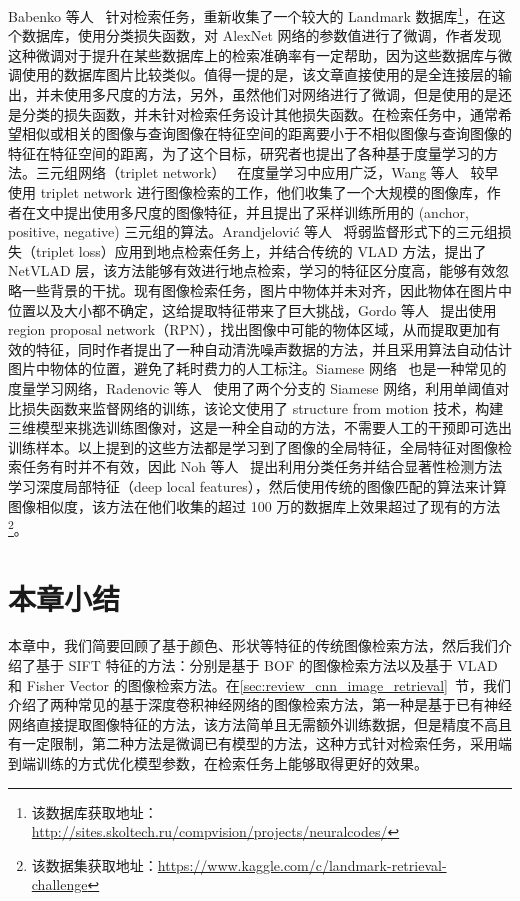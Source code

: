 Babenko 等人~\cite{Babenko2014NeuralCF} 针对检索任务，重新收集了一个较大的 Landmark 数据库\footnote{该数据库获取地址：\url{http://sites.skoltech.ru/compvision/projects/neuralcodes/}}，在这个数据库，使用分类损失函数，对 AlexNet 网络的参数值进行了微调，作者发现这种微调对于提升在某些数据库上的检索准确率有一定帮助，因为这些数据库与微调使用的数据库图片比较类似。值得一提的是，该文章直接使用的是全连接层的输出，并未使用多尺度的方法，另外，虽然他们对网络进行了微调，但是使用的是还是分类的损失函数，并未针对检索任务设计其他损失函数。在检索任务中，通常希望相似或相关的图像与查询图像在特征空间的距离要小于不相似图像与查询图像的特征在特征空间的距离，为了这个目标，研究者也提出了各种基于度量学习的方法。三元组网络（triplet network）~\cite{Wang2014LearningFI,Schroff2015FaceNetAU} 在度量学习中应用广泛，Wang 等人~\cite{Wang2014LearningFI} 较早使用 triplet network 进行图像检索的工作，他们收集了一个大规模的图像库，作者在文中提出使用多尺度的图像特征，并且提出了采样训练所用的 (anchor, positive, negative) 三元组的算法。Arandjelovi{\'c} 等人~\cite{Arandjelovic2016NetVLADCA} 将弱监督形式下的三元组损失（triplet loss）应用到地点检索任务上，并结合传统的 VLAD 方法，提出了 NetVLAD 层，该方法能够有效进行地点检索，学习的特征区分度高，能够有效忽略一些背景的干扰。现有图像检索任务，图片中物体并未对齐，因此物体在图片中位置以及大小都不确定，这给提取特征带来了巨大挑战，Gordo 等人~\cite{Gordo2016DeepIR} 提出使用 region proposal network（RPN），找出图像中可能的物体区域，从而提取更加有效的特征，同时作者提出了一种自动清洗噪声数据的方法，并且采用算法自动估计图片中物体的位置，避免了耗时费力的人工标注。Siamese 网络~\cite{Bell2015LearningVS,Hadsell2006DimensionalityRB} 也是一种常见的度量学习网络，Radenovic 等人~\cite{Radenovic2016CNNIR} 使用了两个分支的 Siamese 网络，利用单阈值对比损失函数来监督网络的训练，该论文使用了 structure from motion 技术，构建三维模型来挑选训练图像对，这是一种全自动的方法，不需要人工的干预即可选出训练样本。以上提到的这些方法都是学习到了图像的全局特征，全局特征对图像检索任务有时并不有效，因此 Noh 等人~\cite{Noh2017LargeScaleIR} 提出利用分类任务并结合显著性检测方法学习深度局部特征（deep local features），然后使用传统的图像匹配的算法来计算图像相似度，该方法在他们收集的超过 100 万的数据库上效果超过了现有的方法\footnote{该数据集获取地址：\url{https://www.kaggle.com/c/landmark-retrieval-challenge}}。


\section{本章小结}\label{sec:related_work_conclusion}
本章中，我们简要回顾了基于颜色、形状等特征的传统图像检索方法，然后我们介绍了基于 SIFT 特征的方法：分别是基于 BOF 的图像检索方法以及基于 VLAD 和 Fisher Vector 的图像检索方法。在\ref{sec:review_cnn_image_retrieval}~节，我们介绍了两种常见的基于深度卷积神经网络的图像检索方法，第一种是基于已有神经网络直接提取图像特征的方法，该方法简单且无需额外训练数据，但是精度不高且有一定限制，第二种方法是微调已有模型的方法，这种方式针对检索任务，采用端到端训练的方式优化模型参数，在检索任务上能够取得更好的效果。
